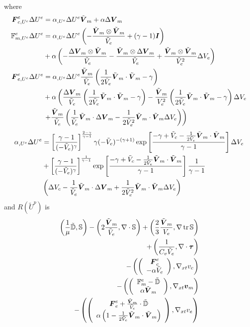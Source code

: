 \documentclass{article}
\begin{document}
where
\begin{align*}
\boldsymbol F^e_{c,U^e}\Delta U^e&=\alpha_{,U^e}\Delta U^e\tilde{\boldsymbol V}_m+\alpha\Delta\boldsymbol V_m\\
\mathbb{F}^e_{m,U^e}\Delta U^e&=
\alpha_{,U^e}\Delta U^e\left( -\frac{\tilde{\boldsymbol V}_m\otimes\tilde{\boldsymbol V}_m}{\tilde V_e}+(\gamma-1)\boldsymbol I \right)\\
&+\alpha\left( 
-\frac{\Delta\boldsymbol V_m\otimes\tilde{\boldsymbol V}_m}{\tilde V_e}
-\frac{\tilde{\boldsymbol V}_m\otimes\Delta\boldsymbol V_m}{\tilde V_e}
+\frac{\tilde{\boldsymbol V}_m\otimes\tilde{\boldsymbol V}_m}{\tilde V_e^2}\Delta V_e
 \right)\\
\boldsymbol F^e_{e,U^e}\Delta U^e&=
\alpha_{,U^e}\Delta U^e\frac{\tilde{\boldsymbol V}_m}{\tilde V_e}\left( \frac{1}{2\tilde V_e}\tilde{\boldsymbol V}_m\cdot\tilde{\boldsymbol V}_m-\gamma \right)\\
&+\alpha\left( 
\frac{\Delta\boldsymbol V_m}{\tilde V_e}\left( \frac{1}{2\tilde V_e}\tilde{\boldsymbol V}_m\cdot\tilde{\boldsymbol V}_m-\gamma \right)
-\frac{\tilde{\boldsymbol V}_m}{V_e^2}\left( \frac{1}{2\tilde V_e}\tilde{\boldsymbol V}_m\cdot\tilde{\boldsymbol V}_m-\gamma \right)\Delta V_e\right.\\
&\left.
+\frac{\tilde{\boldsymbol V}_m}{\tilde V_e}\left( 
\frac{1}{\tilde V_e}\tilde{\boldsymbol V}_m\cdot\Delta\boldsymbol V_m
-\frac{1}{2\tilde V_e^2}\tilde{\boldsymbol V}_m\cdot\tilde{\boldsymbol V}_m\Delta V_e
 \right)
 \right)\\
\end{align*}
\begin{align*}
\alpha_{,U^e}\Delta U^e&=
\left[ \frac{\gamma-1}{(-\tilde V_e)^\gamma} \right]^{\frac{2-\gamma}{\gamma-1}}
\gamma(-\tilde V_e)^{-(\gamma+1)}
\exp\left[ \frac{-\gamma+\tilde V_c-\frac{1}{2\tilde V_e}\tilde{\boldsymbol V}_m\cdot\tilde{\boldsymbol V}_m}{\gamma-1} \right]
\Delta V_e\\
&+\left[ \frac{\gamma-1}{(-\tilde V_e)^\gamma} \right]^{\frac{1}{\gamma-1}}
\exp\left[ \frac{-\gamma+\tilde V_c-\frac{1}{2\tilde V_e}\tilde{\boldsymbol V}_m\cdot\tilde{\boldsymbol V}_m}{\gamma-1} \right]
\frac{1}{\gamma-1}\\
&\left( \Delta V_c
-\frac{1}{\tilde V_e}\tilde{\boldsymbol V}_m\cdot\Delta\boldsymbol V_m
+\frac{1}{2\tilde V_e^2}\tilde{\boldsymbol V}_m\cdot\tilde{\boldsymbol V}_m\Delta V_e
 \right)
\end{align*}
and $R(\tilde U^p)$ is
\begin{align*}
	\left( \frac{1}{\mu}\tilde{\mathbb{D}},\mathbb{S} \right)-\left( 2\frac{\tilde{\boldsymbol V}_m}{\tilde V_e},\nabla\cdot\mathbb{S} \right)
	+\left( \frac{2}{3}\frac{\tilde{\boldsymbol V}_m}{V_e},\nabla\operatorname*{tr}{\mathbb{S}} \right)\\
	+\left( \frac{1}{C_v\tilde V_e},\nabla\cdot\boldsymbol\tau \right)\\
	-\left( \left( \begin{array}{c} \boldsymbol F^e_c\\ -\alpha\tilde V_e\\ \end{array} \right),\nabla_{xt} v_c \right)\\
	-\left( \left( \begin{array}{c} \mathbb{F}^e_m-\tilde{\mathbb{D}}\\ \alpha\tilde{\boldsymbol V}_m\\ \end{array} \right),\nabla_{xt}\boldsymbol v_m \right)\\
	-\left( \left( \begin{array}{c} \boldsymbol F^e_e+\frac{\tilde{\boldsymbol V}_m}{\tilde V_e}\cdot\tilde{\mathbb{D}}\\ \alpha\left( 1-\frac{1}{2\tilde V_e}\tilde{\boldsymbol V}_m\cdot\tilde{\boldsymbol V}_m \right)\\ \end{array} \right),\nabla_{xt} v_e \right)
\end{align*}
\end{document}
